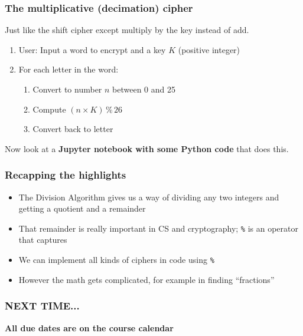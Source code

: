 \documentclass{beamer}
\begin{document}
\begin{frame}[fragile]
    \frametitle{The multiplicative (decimation) cipher}

    Just like the shift cipher except multiply by the key instead of add. 
    
    \begin{enumerate}
        \item User: Input a word to encrypt and a key $K$ (positive integer)
        \item For each letter in the word: 
        \begin{enumerate}
            \item Convert to number $n$ between 0 and 25 
            \item Compute $(n \times K) \, \% \, 26$
            \item Convert back to letter 
        \end{enumerate}
    \end{enumerate}

Now look at a \textbf{Jupyter notebook with some Python code} that does this. 

\end{frame}

\begin{frame}
    \frametitle{Recapping the highlights}

    \begin{itemize}
        \item The Division Algorithm gives us a way of dividing any two integers and getting a quotient and a remainder 
        \item That remainder is really important in CS and cryptography; \texttt{\%} is an operator that captures 
        \item We can implement all kinds of ciphers in code using \texttt{\%}
        \item However the math gets complicated, for example in finding ``fractions''
    \end{itemize}

\end{frame}


\begin{frame}
    \frametitle{NEXT TIME...}

\begin{center}
    \textbf{All due dates are on the course calendar}
\end{center}


\end{frame}
\end{document}
